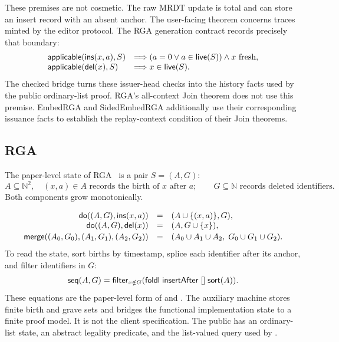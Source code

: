 These premises are not cosmetic. The raw MRDT update is total and can store an
insert record with an absent anchor. The user-facing theorem concerns traces
minted by the editor protocol. The RGA generation contract records precisely
that boundary:
\[
\begin{array}{ll}
\mathsf{applicable}(\mathsf{ins}(x,a),S) &\Longrightarrow
  (a=0\lor a\in\mathsf{live}(S))\land
  x\text{ fresh},\\
\mathsf{applicable}(\mathsf{del}(x),S) &\Longrightarrow
  x\in\mathsf{live}(S).
\end{array}
\]
The checked bridge turns these issuer-head checks into the history facts used
by the public ordinary-list proof. RGA's all-context Join theorem does not use
this premise. EmbedRGA and SidedEmbedRGA additionally use their corresponding
issuance facts to establish the replay-context condition of their Join
theorems.

\subsection{RGA}
\label{sec:baseline}

The paper-level state of RGA~\cite{roh2011rga} is a pair $S=(A,G)$:
\[
 A\subseteq \mathbb N^2,\quad (x,a)\in A
 \text{ records the birth of $x$ after $a$};
 \qquad G\subseteq\mathbb N
 \text{ records deleted identifiers}.
\]
Both components grow monotonically.

\[
\begin{array}{rcl}
\mathsf{do}((A,G),\mathsf{ins}(x,a)) &=& (A\cup\{(x,a)\},G),\\
\mathsf{do}((A,G),\mathsf{del}(x)) &=& (A,G\cup\{x\}),\\[2pt]
\mathsf{merge}((A_0,G_0),(A_1,G_1),(A_2,G_2))
  &=& (A_0\cup A_1\cup A_2,\;G_0\cup G_1\cup G_2).
\end{array}
\]
To read the state, sort births by timestamp, splice each identifier after its
anchor, and filter identifiers in $G$:
\[
  \mathsf{seq}(A,G)=\mathsf{filter}_{x\notin G}
    (\mathsf{foldl}\;\mathsf{insertAfter}\;[]\;\mathsf{sort}(A)).
\]
These equations are the paper-level form of  and
. The auxiliary machine
 stores finite birth and grave sets and
bridges the functional implementation state to a finite proof model. It is not
the client specification. The public  has an
ordinary-list state, an abstract legality predicate, and the list-valued query
used by .

